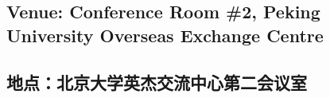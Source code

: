 

\newpage
{}
{}
\subsection*{Venue: Conference Room \#2, Peking University Overseas Exchange Centre}
\subsection*{地点：北京大学英杰交流中心第二会议室}


